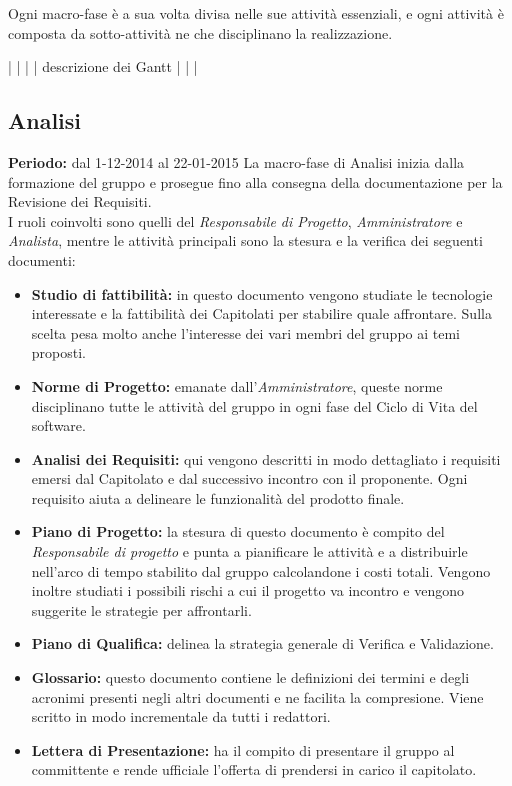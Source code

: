 Ogni macro-fase è a sua volta divisa nelle sue attività essenziali, e ogni attività è composta da sotto-attività ne che disciplinano la realizzazione.

|
|
|
|  descrizione dei Gantt
|
|
|


\subsection{Analisi}
\textbf{Periodo:} dal 1-12-2014 al 22-01-2015
La macro-fase di Analisi inizia dalla formazione del gruppo e prosegue fino alla consegna della documentazione per la Revisione dei Requisiti. \\
I ruoli coinvolti sono quelli del \textit{Responsabile di Progetto}, \textit{Amministratore} e \textit{Analista}, mentre le attività principali sono la stesura e la verifica dei seguenti documenti:

\begin{itemize}
\item \textbf{Studio di fattibilità:} in questo documento vengono studiate le tecnologie interessate e la fattibilità dei Capitolati per stabilire quale affrontare. Sulla scelta pesa molto anche l'interesse dei vari membri del gruppo ai temi proposti.
\item \textbf{Norme di Progetto:} emanate dall'\textit{Amministratore}, queste norme disciplinano tutte le attività del gruppo in ogni fase del Ciclo di Vita del software.
\item \textbf{Analisi dei Requisiti:} qui vengono descritti in modo dettagliato i requisiti emersi dal Capitolato e dal successivo incontro con il proponente. Ogni requisito aiuta a delineare le funzionalità del prodotto finale.
\item \textbf{Piano di Progetto:} la stesura di questo documento è compito del \textit{Responsabile di progetto} e punta a pianificare le attività e a distribuirle nell'arco di tempo stabilito dal gruppo calcolandone i costi totali. Vengono inoltre studiati i possibili rischi a cui il progetto va incontro e vengono suggerite le strategie per affrontarli.
\item \textbf{Piano di Qualifica:} delinea la strategia generale di Verifica e Validazione.
\item \textbf{Glossario:} questo documento contiene le definizioni dei termini e degli acronimi presenti negli altri documenti e ne facilita la compresione. Viene scritto in modo incrementale da tutti i redattori.
\item \textbf{Lettera di Presentazione:} ha il compito di presentare il gruppo al committente e rende ufficiale l'offerta di prendersi in carico il capitolato.
\end{itemize}

